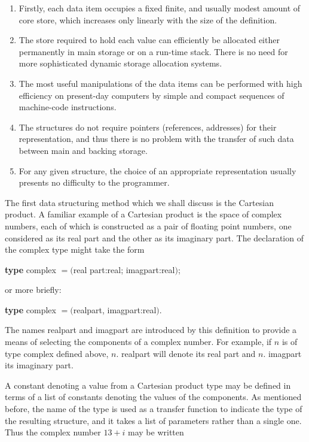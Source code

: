 \begin{enumerate}[wide, nosep, label=(\arabic*)]
	\item Firstly, each data item occupies a fixed finite, and usually modest amount of core store, which increases only linearly with the size of the definition.

	\item The store required to hold each value can efficiently be allocated either permanently in main storage or on a run-time stack. There is no need for more sophisticated dynamic storage allocation systems.

	\item The most useful manipulations of the data items can be performed with high efficiency on present-day computers by simple and compact sequences of machine-code instructions.

	\item The structures do not require pointers (references, addresses) for their representation, and thus there is no problem with the transfer of such data between main and backing storage.

	\item For any given structure, the choice of an appropriate representation usually presents no difficulty to the programmer.
\end{enumerate}

The first data structuring method which we shall discuss is the Cartesian product. A familiar example of a Cartesian product is the space of complex numbers, each of which is constructed as a pair of floating point numbers, one considered as its real part and the other as its imaginary part. The declaration of the complex type might take the form

\quad \textbf{type} complex $= ($real part:real; imagpart:real$)$;
\nopagebreak

\noindent
or more briefly:
\nopagebreak

\quad \textbf{type} complex $= ($realpart, imagpart:real$)$.

The names realpart and imagpart are introduced by this definition to provide a means of selecting the components of a complex number. For example, if $n$ is of type complex defined above, $n$. realpart will denote its real part and $n$. imagpart its imaginary part.

A constant denoting a value from a Cartesian product type may be defined in terms of a list of constants denoting the values of the components. As mentioned before, the name of the type is used as a transfer function to indicate the type of the resulting structure, and it takes a list of parameters rather than a single one. Thus the complex number $13 + i$ may be written

